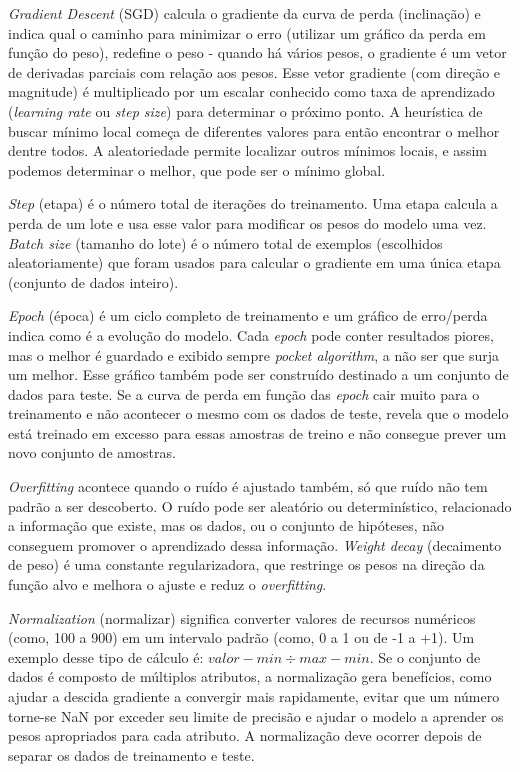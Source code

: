 \textit{Gradient Descent} (SGD) calcula o gradiente da curva de perda (inclinação) e indica qual o caminho para minimizar o erro (utilizar um gráfico da perda em função do peso), redefine o peso - quando há vários pesos, o gradiente é um vetor de derivadas parciais com relação aos pesos. Esse vetor gradiente (com direção e magnitude) é multiplicado por um escalar conhecido como taxa de aprendizado (\textit{learning rate} ou \textit{step size}) para determinar o próximo ponto. A heurística de buscar mínimo local começa de diferentes valores para então encontrar o melhor dentre todos. A aleatoriedade permite localizar outros mínimos locais, e assim podemos determinar o melhor, que pode ser o mínimo global.

\textit{Step} (etapa) é o número total de iterações do treinamento. Uma etapa calcula a perda de um lote e usa esse valor para modificar os pesos do modelo uma vez. \textit{Batch size} (tamanho do lote) é o número total de exemplos (escolhidos aleatoriamente) que foram usados para calcular o gradiente em uma única etapa (conjunto de dados inteiro).

\textit{Epoch} (época) é um ciclo completo de treinamento e um gráfico de erro/perda indica como é a evolução do modelo. Cada \textit{epoch} pode conter resultados piores, mas o melhor é guardado e exibido sempre \textit{pocket algorithm}, a não ser que surja um melhor. Esse gráfico também pode ser construído destinado a um conjunto de dados para teste. Se a curva de perda em função das \textit{epoch} cair muito para o treinamento e não acontecer o mesmo com os dados de teste, revela que o modelo está treinado em excesso para essas amostras de treino e não consegue prever um novo conjunto de amostras.

\textit{Overfitting} acontece quando o ruído é ajustado também, só que ruído não tem padrão a ser descoberto. O ruído pode ser aleatório ou determinístico, relacionado a informação que existe, mas os dados, ou o conjunto de hipóteses, não conseguem promover o aprendizado dessa informação. \textit{Weight decay} (decaimento de peso) é uma constante regularizadora, que restringe os pesos na direção da função alvo e melhora o ajuste e reduz o \textit{overfitting}.

\textit{Normalization} (normalizar) significa converter valores de recursos numéricos (como, 100 a 900) em um intervalo padrão (como, 0 a 1 ou de -1 a +1). Um exemplo desse tipo de cálculo é: $valor - min \div max - min$. Se o conjunto de dados é composto de múltiplos atributos, a normalização gera benefícios, como ajudar a descida gradiente a convergir mais rapidamente, evitar que um número torne-se NaN por exceder seu limite de precisão e ajudar o modelo a aprender os pesos apropriados para cada atributo. A normalização deve ocorrer depois de separar os dados de treinamento e teste.

